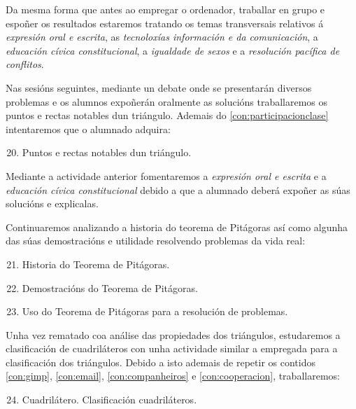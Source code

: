 Da mesma forma que antes ao empregar o ordenador, traballar en grupo e espoñer os resultados estaremos tratando os temas transversais relativos á \emph{expresión oral e escrita}, as \emph{tecnoloxías información e da comunicación}, a \emph{educación cívica constitucional}, a \emph{igualdade de sexos} e a \emph{resolución pacífica de conflitos}.

Nas sesións seguintes, mediante un debate onde se presentarán diversos problemas e os alumnos expoñerán oralmente as solucións traballaremos os puntos e rectas notables dun triángulo. Ademais do \ref{con:participacionclase} intentaremos que o alumnado adquira:

\begin{enumerate}[label=\bfseries Con\arabic*, align=left, leftmargin=1.5cm]
  \setcounter{enumi}{19}
  \item\label{con:puntosrectasnotables} Puntos e rectas notables dun triángulo.
\end{enumerate}

Mediante a actividade anterior fomentaremos a \emph{expresión oral e escrita} e a \emph{educación cívica constitucional} debido a que a alumnado deberá expoñer as súas solucións e explicalas.

Continuaremos analizando a historia do teorema de Pitágoras así como algunha das súas demostracións e utilidade resolvendo problemas da vida real:

\begin{enumerate}[label=\bfseries Con\arabic*, align=left, leftmargin=1.5cm]
  \setcounter{enumi}{20}
  \item\label{con:histpitag} Historia do Teorema de Pitágoras.
  \item\label{con:dempitag} Demostracións do Teorema de Pitágoras.
  \item\label{con:problepitag} Uso do Teorema de Pitágoras para a resolución de problemas.
\end{enumerate}

Unha vez rematado coa análise das propiedades dos triángulos, estudaremos a clasificación de cuadriláteros con unha actividade similar a empregada para a clasificación dos triángulos. Debido a isto ademais de repetir os contidos \ref{con:gimp}, \ref{con:email}, \ref{con:companheiros} e \ref{con:cooperacion}, traballaremos:

\begin{enumerate}[label=\bfseries Con\arabic*, align=left, leftmargin=1.5cm]
  \setcounter{enumi}{23}
  \item\label{con:cuadrilateros} Cuadrilátero. Clasificación cuadriláteros.
\end{enumerate}

